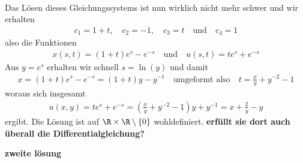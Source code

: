 \begin{solution}
\begin{align*}
\end{align*}
Das Lösen dieses Gleichungssystems ist nun wirklich nicht mehr schwer und wir erhalten
\begin{align*}
c_1 = 1 + t, \quad c_2 = -1, \quad c_3 = t \quad \text{und} \quad c_4 = 1
\end{align*}
also die Funktionen
\begin{align*}
x(s,t) = (1 + t) e^s - e^{-s} \quad \text{und} \quad u(s,t) = t e^s + e^{-s}
\end{align*}
Aus $y = e^s$ erhalten wir schnell $s = \ln(y)$ und damit 
\begin{align*}
x = (1+t) e^s - e^{-s} = (1 + t)y - y^{-1} \quad \text{umgeformt also} \quad t = \frac{x}{y} + y^{-2} - 1 
\end{align*}
woraus sich insgesamt
\begin{align*}
u(x,y) = t e^s + e^{-s} = \left(\frac{x}{y} + y^{-2} - 1 \right) y + y^{-1} = x + \frac{2}{y} - y
\end{align*}
ergibt. Die Lösung ist auf $\R \times \R \setminus \{0\}$ wohldefiniert. \textbf{erfüllt sie dort auch überall die Differentialgleichung?}
\end{solution}

\textbf{zweite lösung}

